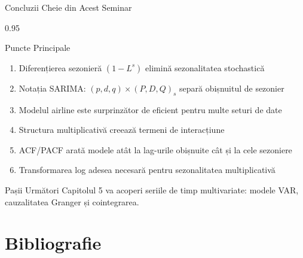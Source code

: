 \documentclass[9pt, aspectratio=169, t]{beamer}
\begin{document}
\begin{frame}{Concluzii Cheie din Acest Seminar}
    \begin{cminipage}{0.95\textwidth}
    \begin{block}{Puncte Principale}
        \begin{enumerate}\setlength{\itemsep}{0pt}
            \item Diferențierea sezonieră $(1-L^s)$ elimină sezonalitatea stochastică
            \item Notația SARIMA: $(p,d,q) \times (P,D,Q)_s$ separă obișnuitul de sezonier
            \item Modelul airline este surprinzător de eficient pentru multe seturi de date
            \item Structura multiplicativă creează termeni de interacțiune
            \item ACF/PACF arată modele atât la lag-urile obișnuite cât și la cele sezoniere
            \item Transformarea log adesea necesară pentru sezonalitatea multiplicativă
        \end{enumerate}
    \end{block}

    \vspace{0.2cm}
    \begin{alertblock}{Pașii Următori}
        Capitolul 5 va acoperi seriile de timp multivariate: modele VAR, cauzalitatea Granger și cointegrarea.
    \end{alertblock}
    \end{cminipage}
\end{frame}

\section{Bibliografie}
\end{document}
